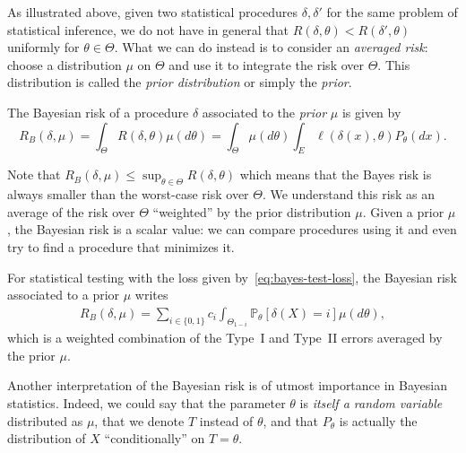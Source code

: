 \documentclass[
	fontsize=11pt, %
	twoside=false, %
	numbers=noenddot, %
]{kaobook}
\renewcommand{\P}{\mathbb P}
\begin{document}

As illustrated above, given two statistical procedures $\delta, \delta'$ for the same problem of statistical inference, we do not have in general that $R(\delta, \theta) < R(\delta', \theta)$ uniformly for $\theta \in \Theta$.
What we can do instead is to consider an \emph{averaged risk}: choose a distribution $\mu$ on $\Theta$ and use it to integrate the risk over $\Theta$.
This distribution is called the \emph{prior distribution} or simply the \emph{prior}.
\begin{definition}
	The Bayesian risk of a procedure $\delta$ associated to the \emph{prior} $\mu$ is given by
	\begin{equation*}
		R_B(\delta, \mu) = \int_{\Theta} R(\delta, \theta) \mu(d \theta) 
		= \int_{\Theta} \mu(d \theta) \int_E \ell(\delta(x), \theta) P_\theta(dx).
	\end{equation*}
\end{definition}
Note that $R_B(\delta, \mu) \leq \sup_{\theta \in \Theta} R(\delta, \theta)$ which means that the Bayes risk is always smaller than the worst-case risk over $\Theta$.
We understand this risk as an average of the risk over $\Theta$ ``weighted'' by the prior distribution $\mu$.
Given a prior $\mu$, the Bayesian risk is a scalar value: we can compare procedures using it and even try to find a procedure that minimizes it.%

\begin{example}
	For statistical testing with the loss given by~\eqref{eq:bayes-test-loss}, the Bayesian risk associated to a prior $\mu$ writes
	\begin{align*}
		R_B(\delta, \mu) = \sum_{i \in \{ 0, 1 \}} c_i \int_{\Theta_{1 - i}} \P_\theta[\delta(X) = i] \mu(d \theta),
	\end{align*}
	which is a weighted combination of the Type~I and Type~II errors averaged by the prior $\mu$.
\end{example}

Another interpretation of the Bayesian risk is of utmost importance in Bayesian statistics.
Indeed, we could say that the parameter $\theta$ is \emph{itself a random variable} distributed as $\mu$, that we denote $T$ instead of $\theta$, and that $P_\theta$ is actually the distribution of $X$ ``conditionally'' on $T = \theta$.%
\end{document}
